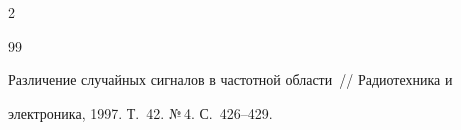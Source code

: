 \begin{multicols}{2}
{{\begin{thebibliography}{99}




Различение случайных сигналов в час\-тот\-ной области~// Радиотехника и 


электроника, 1997. Т.~42. №\,4. С.~426--429.


 \end{thebibliography}


}


}








\end{multicols}  


